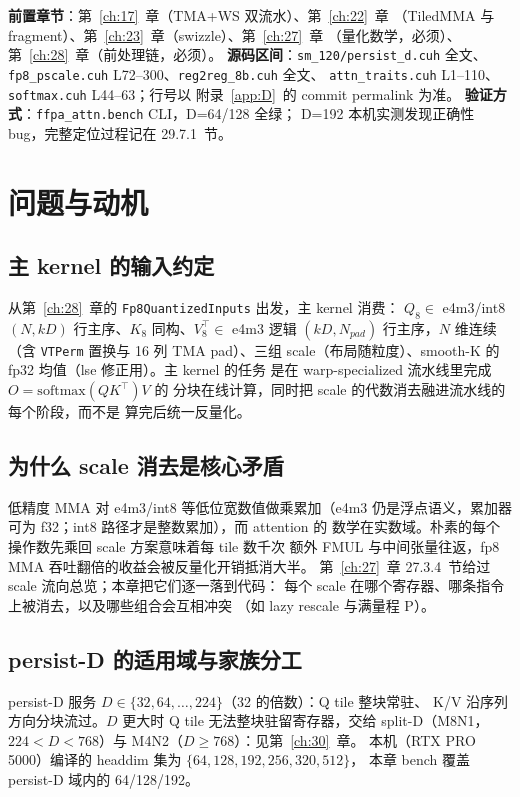 \textbf{前置章节}：第~\ref{ch:17}~章（TMA+WS 双流水）、第~\ref{ch:22}~章
（TiledMMA 与 fragment）、第~\ref{ch:23}~章（swizzle）、第~\ref{ch:27}~章
（量化数学，必须）、第~\ref{ch:28}~章（前处理链，必须）。
\textbf{源码区间}：\texttt{sm\_120/persist\_d.cuh} 全文、
\texttt{fp8\_pscale.cuh} L72--300、\texttt{reg2reg\_8b.cuh} 全文、
\texttt{attn\_traits.cuh} L1--110、\texttt{softmax.cuh} L44--63；行号以
附录~\ref{app:D}~的 commit permalink 为准。
\textbf{验证方式}：\texttt{ffpa\_attn.bench} CLI，D=64/128 全绿；
D=192 本机实测发现正确性 bug，完整定位过程记在 29.7.1~节。

\section{问题与动机}

\subsection{主 kernel 的输入约定}

从第~\ref{ch:28}~章的 \texttt{Fp8QuantizedInputs} 出发，主 kernel 消费：
$Q_8\in$ e4m3/int8 $(N,kD)$ 行主序、$K_8$ 同构、$V_8^{\top}\in$ e4m3
逻辑 $(kD,N_{pad})$ 行主序，$N$ 维连续（含 \texttt{VTPerm} 置换与 16 列 TMA pad）、三组
scale（布局随粒度）、smooth-K 的 fp32 均值（lse 修正用）。主 kernel 的任务
是在 warp-specialized 流水线里完成 $O = \mathrm{softmax}(QK^{\top})V$ 的
分块在线计算，同时把 scale 的代数消去融进流水线的每个阶段，而不是
算完后统一反量化。

\subsection{为什么 scale 消去是核心矛盾}

低精度 MMA 对 e4m3/int8 等低位宽数值做乘累加（e4m3 仍是浮点语义，累加器可为 f32；int8 路径才是整数累加），而 attention 的
数学在实数域。朴素的每个操作数先乘回 scale 方案意味着每 tile 数千次
额外 FMUL 与中间张量往返，fp8 MMA 吞吐翻倍的收益会被反量化开销抵消大半。
第~\ref{ch:27}~章 27.3.4~节给过 scale 流向总览；本章把它们逐一落到代码：
每个 scale 在哪个寄存器、哪条指令上被消去，以及哪些组合会互相冲突
（如 lazy rescale 与满量程 P）。

\subsection{persist-D 的适用域与家族分工}

persist-D 服务 $D\in\{32,64,\dots,224\}$（32 的倍数）：Q tile 整块常驻、
K/V 沿序列方向分块流过。$D$ 更大时 Q tile 无法整块驻留寄存器，交给
split-D（M8N1，$224<D<768$）与 M4N2（$D\ge768$）：见第~\ref{ch:30}~章。
本机（RTX PRO 5000）编译的 headdim 集为 $\{64,128,192,256,320,512\}$，
本章 bench 覆盖 persist-D 域内的 64/128/192。

